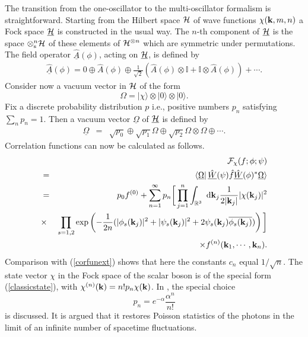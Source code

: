 \documentclass[12pt,a4paper]{article}
\def\Ro{{\mathbb R}}
\def\Io{{\mathbb I}}
\def\kk{{\bf k}}
\begin{document}
The transition from the one-oscillator to the multi-oscillator formalism
is straightforward. Starting from the Hilbert space $\cal H$ of wave functions
$\chi(\kk,m,n)$ a Fock space $\underline{\cal H}$ is constructed in the
usual way. The $n$-th component of $\underline{\cal H}$ is the space
$\otimes^n_{\rm s}{\cal H}$ of these elements of ${\cal H}^{\otimes n}$
which are symmetric under permutations. The field operator
$\underline{\hat A}(\phi)$, acting on $\underline{\cal H}$,
is defined by
\begin{eqnarray}
\underline{\hat A}(\phi)=0\oplus\hat A(\phi)
\oplus\frac{1}{\sqrt 2}\left(\hat A(\phi)\otimes\Io+\Io\otimes \hat A(\phi)\right)
+\cdots.
\end{eqnarray}
Consider now a vacuum vector in $\cal H$ of the form
\begin{equation}
\Omega=|\chi\rangle\otimes|0\rangle\otimes|0\rangle.
\end{equation}
Fix a discrete probability distribution $p$ i.e., positive numbers $p_n$
satisfying $\sum_np_n=1$. Then a vacuum vector $\underline\Omega$ of $\underline{\cal H}$
is defined by
\begin{eqnarray}
\underline\Omega
&=&\sqrt{p_0}\oplus \sqrt{p_1}\Omega\oplus \sqrt{p_2}\Omega\otimes\Omega\oplus\cdots.
\end{eqnarray}
Correlation functions can now be calculated as follows.
\begin{eqnarray}& &
{\cal F}_\chi(f;\phi;\psi)\cr
&=&\langle\underline\Omega|
\,\underline{\hat W}(\psi)\hat f\underline{\hat W}(\phi)^*
\underline\Omega\rangle\cr
&=&p_0f^{(0)}+\sum_{n=1}^\infty p_n
\bigg[\prod_{j=1}^n
\int_{\Ro^3}\hbox{ d}\kk_j\frac{1}{2|\kk_j|}|\chi(\kk_j)|^2\cr
&\times&\prod_{s=1,2}
\exp\left(-\frac{1}{2n}(|\phi_s(\kk_j)|^2+|\psi_s(\kk_j)|^2
+2\psi_s(\kk_j)\overline{\phi_s(\kk_j)})\right)
\bigg]\cr
& &\times f^{(n)}(\kk_1,\cdots,\kk_n).
\end{eqnarray}
Comparison with (\ref{corfunext}) shows that here the constants $c_n$ equal $1/\sqrt n$.
The state vector $\chi$ in the Fock space of the scalar boson is of
the special form (\ref{classicstate}),
with $\chi^{(n)}(\kk)=n!p_n\chi(\kk)$. In \cite {CM02}, the special choice
\begin{equation}
p_n=e^{-\alpha}\frac{\alpha^n}{n!}
\end{equation}
is discussed. It is argued that it restores Poisson statistics of the photons
in the limit of an infinite number of spacetime fluctuations.


\end{document}
